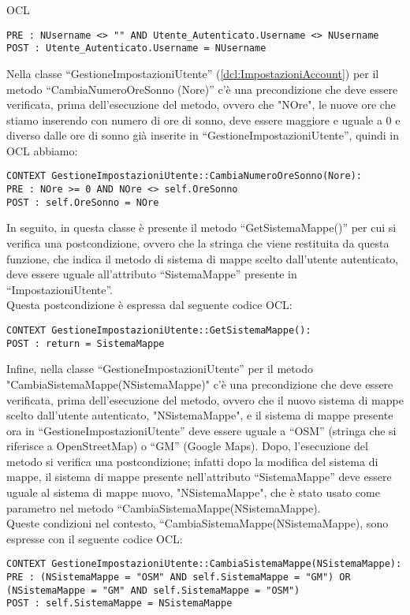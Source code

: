 \begin{listaPersonale}{OCL}
\begin{lstlisting}
PRE : NUsername <> "" AND Utente_Autenticato.Username <> NUsername
POST : Utente_Autenticato.Username = NUsername
    \end{lstlisting}
    Nella classe “GestioneImpostazioniUtente” (\ref{dcl:ImpostazioniAccount}) per il metodo “CambiaNumeroOreSonno (Nore)” c'è una precondizione che deve essere verificata, prima dell'esecuzione del metodo, ovvero che "NOre", le nuove ore che stiamo inserendo con numero di ore di sonno, deve essere maggiore e uguale a 0 e diverso dalle ore di sonno già inserite in “GestioneImpostazioniUtente”, quindi in OCL abbiamo:
    \begin{lstlisting} 
CONTEXT GestioneImpostazioniUtente::CambiaNumeroOreSonno(Nore):
PRE : NOre >= 0 AND NOre <> self.OreSonno
POST : self.OreSonno = NOre
    \end{lstlisting}
    In seguito, in questa classe è presente il metodo “GetSistemaMappe()” per cui si verifica una postcondizione, ovvero che la stringa che viene restituita da questa funzione, che indica il metodo di sistema di mappe scelto dall'utente autenticato, deve essere uguale all'attributo “SistemaMappe” presente in “ImpostazioniUtente”. \\ Questa postcondizione è espressa dal seguente codice OCL:\\
    \begin{lstlisting}
CONTEXT GestioneImpostazioniUtente::GetSistemaMappe():
POST : return = SistemaMappe 
    \end{lstlisting}
    Infine, nella classe “GestioneImpostazioniUtente” per il metodo \\"CambiaSistemaMappe(NSistemaMappe)" c'è una precondizione che deve essere verificata, prima dell'esecuzione del metodo, ovvero che il nuovo sistema di mappe scelto dall'utente autenticato, "NSistemaMappe", e il sistema di mappe presente ora in “GestioneImpostazioniUtente” deve essere uguale a “OSM” (stringa che si riferisce a OpenStreetMap) o “GM” (Google Maps).
    Dopo, l'esecuzione del metodo si verifica una postcondizione; infatti dopo la modifica del sistema di mappe, il sistema di mappe presente nell'attributo “SistemaMappe” deve essere uguale al sistema di mappe nuovo, "NSistemaMappe", che è stato usato come parametro nel metodo “CambiaSistemaMappe(NSistemaMappe).\\
    Queste condizioni nel contesto, “CambiaSistemaMappe(NSistemaMappe), sono espresse con il seguente codice OCL:

    \begin{lstlisting}
CONTEXT GestioneImpostazioniUtente::CambiaSistemaMappe(NSistemaMappe):
PRE : (NSistemaMappe = "OSM" AND self.SistemaMappe = "GM") OR (NSistemaMappe = "GM" AND self.SistemaMappe = "OSM")
POST : self.SistemaMappe = NSistemaMappe
    \end{lstlisting}





\end{listaPersonale}
